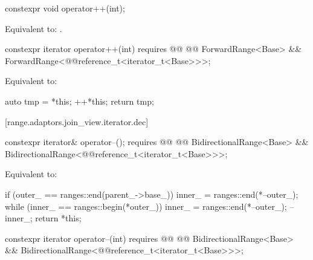 \begin{itemdecl}
constexpr void operator++(int);
\end{itemdecl}

\begin{itemdescr}
\pnum
\effects Equivalent to: .
\end{itemdescr}

\begin{itemdecl}
constexpr iterator operator++(int)
  requires @@
    @@ ForwardRange<Base> &&
    ForwardRange<@@reference_t<iterator_t<Base>>>;
\end{itemdecl}

\begin{itemdescr}
\pnum
\effects Equivalent to:
\begin{codeblock}
auto tmp = *this;
++*this;
return tmp;
\end{codeblock}
\end{itemdescr}

[range.adaptors.join_view.iterator.dec]{}

\begin{itemdecl}
constexpr iterator& operator--();
  requires @@
    @@ BidirectionalRange<Base> &&
    BidirectionalRange<@@reference_t<iterator_t<Base>>>;
\end{itemdecl}

\begin{itemdescr}
\pnum
\effects Equivalent to:
\begin{codeblock}
if (outer_ == ranges::end(parent_->base_))
  inner_ = ranges::end(*--outer_);
while (inner_ == ranges::begin(*outer_))
  inner_ = ranges::end(*--outer_);
--inner_;
return *this;
\end{codeblock}
\end{itemdescr}

\begin{itemdecl}
constexpr iterator operator--(int)
  requires @@
    @@ BidirectionalRange<Base> &&
    BidirectionalRange<@@reference_t<iterator_t<Base>>>;
\end{itemdecl}

